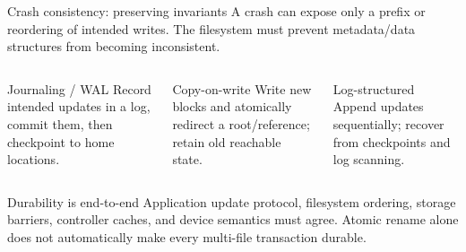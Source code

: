 \documentclass[aspectratio=169,11pt]{beamer}
\begin{document}
\begin{frame}{Crash consistency: preserving invariants}
  A crash can expose only a prefix or reordering of intended writes. The filesystem must prevent metadata/data structures from becoming inconsistent.
  \begin{columns}[T,onlytextwidth]
      \begin{block}{Journaling / WAL}
        Record intended updates in a log, commit them, then checkpoint to home locations.
      \end{block}
      \begin{block}{Copy-on-write}
        Write new blocks and atomically redirect a root/reference; retain old reachable state.
      \end{block}
      \begin{block}{Log-structured}
        Append updates sequentially; recover from checkpoints and log scanning.
      \end{block}
  \end{columns}
  \begin{alertblock}{Durability is end-to-end}
    Application update protocol, filesystem ordering, storage barriers, controller caches, and device semantics must agree. Atomic rename alone does not automatically make every multi-file transaction durable.
  \end{alertblock}
\end{frame}
\end{document}
